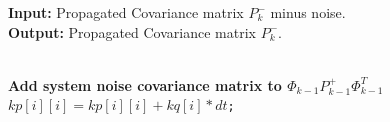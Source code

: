 \documentclass[journal]{IEEEtran}
\begin{document}
\begin{algorithm}[!h]
\caption{Addition of system noise to error covariance matrix}
 \hspace*{\algorithmicindent} \textbf{Input:} Propagated Covariance matrix $P_k^-$ minus noise.\\
 \hspace*{\algorithmicindent} \textbf{Output:} Propagated Covariance matrix $P_k^-$.
\begin{algorithmic}[1]
\\\textbf{\color{Red}Add system noise covariance matrix to $\Phi_{k-1} P_{k-1}^+\Phi_{k-1}^T$}\\
    \State \texttt{$kp[i][i] = kp[i][i] + kq[i] * dt$;}
      \EndFor
\EndFunction
\end{algorithmic}
\label{inter3}
\end{algorithm}




\end{document}
